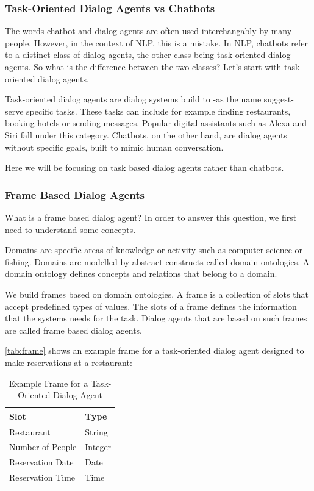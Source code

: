 \subsubsection{Task-Oriented Dialog Agents vs Chatbots}
The words chatbot and dialog agents are often used interchangably by many people.
However, in the context of NLP, this is a mistake.
In NLP, chatbots refer to a distinct class of dialog agents, the other class being task-oriented dialog agents.
So what is the difference between the two classes? 
Let's start with task-oriented dialog agents.

Task-oriented dialog agents are dialog systems build to -as the name suggest- serve specific tasks.
These tasks can include for example finding restaurants, booking hotels or sending messages.
Popular digital assistants such as Alexa and Siri fall under this category.
Chatbots, on the other hand, are dialog agents without specific goals, built to mimic human conversation.

Here we will be focusing on task based dialog agents rather than chatbots.

\subsubsection{Frame Based Dialog Agents}
What is a frame based dialog agent?
In order to answer this question, we first need to understand some concepts.

Domains are specific areas of knowledge or activity such as computer science or fishing.
Domains are modelled by abstract constructs called domain ontologies.
A domain ontology defines concepts and relations that belong to a domain.

We build frames based on domain ontologies.
A frame is a collection of slots that accept predefined types of values.
The slots of a frame defines the information that the systems needs for the task.
Dialog agents that are based on such frames are called frame based dialog agents.

\autoref{tab:frame} shows an example frame for a task-oriented dialog agent designed to make reservations at a restaurant:

\begin{table}[htbp]
  \caption[Example Frame for a Task-Oriented Dialog Agent]{Example Frame for a Task-Oriented Dialog Agent}\label{tab:frame}
  \centering
  \begin{tabular}{l|l}
    Slot&Type\\ \toprule
    Restaurant&String\\ \hline
    Number of People&Integer\\ \hline
    Reservation Date&Date\\ \hline
    Reservation Time&Time\\ \hline
  \end{tabular}
\end{table}

